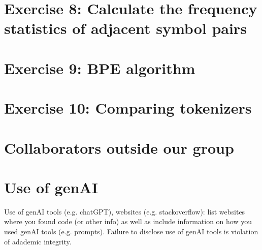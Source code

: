 \documentclass[11pt]{article}
\begin{document}
\section{Exercise 8: Calculate the frequency statistics of adjacent symbol pairs}

\section{Exercise 9: BPE algorithm}

\section{Exercise 10: Comparing tokenizers}

%



\appendix

\section{Collaborators outside our group}



\section{Use of genAI}

Use of genAI tools (e.g. chatGPT), websites (e.g. stackoverflow): list websites where you found code (or other info) as well as include information on how you used genAI tools (e.g. prompts).  Failure to disclose use of genAI tools is violation of adademic integrity.

\end{document}
